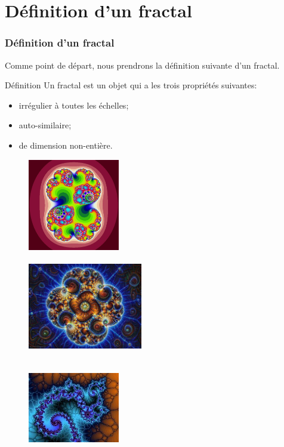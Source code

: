 \documentclass[aspectratio=1610]{beamer}
\begin{document}
\section{Définition d'un fractal}

\begin{frame}
\frametitle{Définition d'un fractal}
Comme point de départ, nous prendrons la définition suivante d'un fractal.
\begin{block}{Définition}
Un fractal est un objet qui a les trois propriétés suivantes:
\begin{itemize}
    \item irrégulier à toutes les échelles;
    \item auto-similaire;
    \item de dimension non-entière.
\end{itemize}
\end{block}
\begin{minipage}{0.3\textwidth}
\begin{figure}[h]
    \centering
    \includegraphics[width=4cm, height=4cm]{fractal_7}
    \label{fig:fractal_7}
\end{figure}
\end{minipage}%
\begin{minipage}{0.4\textwidth}
    \begin{figure}[h]
        \centering
        \includegraphics[width=5cm, height=4cm]{fractal-wallpaper}
        \label{fig:fractal-wallpaper}
    \end{figure} 
\end{minipage}%
\begin{minipage}{0.3\textwidth}
    \begin{figure}[h]
        \centering
        \includegraphics[width=4cm, height=4cm]{zbulle3}
        \label{fig:mfractal}
    \end{figure} 
\end{minipage}
\end{frame}
\end{document}
